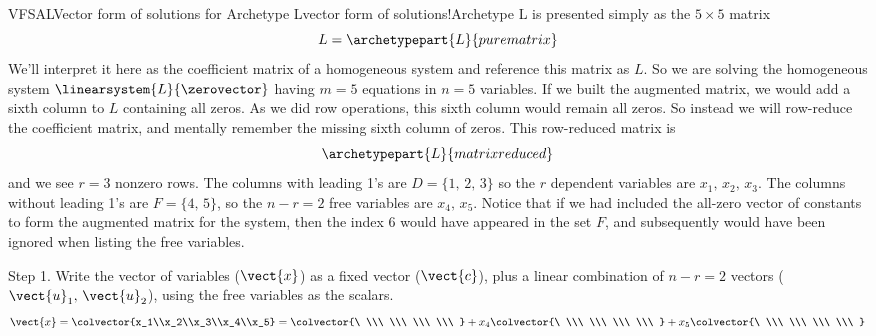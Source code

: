 \begin{example}{VFSAL}{Vector form of solutions for Archetype L}{vector form of solutions!Archetype L}
 is presented simply as the $5\times 5$ matrix
%
\begin{equation*}
L=\archetypepart{L}{purematrix}
\end{equation*}
%
We'll interpret it here as the coefficient matrix of a homogeneous system and reference this matrix as $L$.  So we are solving the homogeneous system $\linearsystem{L}{\zerovector}$ having $m=5$ equations in $n=5$ variables.  If we built the augmented matrix, we would add a sixth column to $L$ containing all zeros.  As we did row operations, this sixth column would remain all zeros.  So instead we will row-reduce the coefficient matrix, and mentally remember the missing sixth column of zeros.  This row-reduced matrix is
%
\begin{equation*}
\archetypepart{L}{matrixreduced}
\end{equation*}
%
and we see $r=3$ nonzero rows.  The columns with leading 1's are $D=\{1,\,2,\,3\}$ so the $r$ dependent variables are $x_1,\,x_2,\,x_3$.  The columns without leading 1's are $F=\{4,\,5\}$, so the $n-r=2$ free variables are $x_4,\,x_5$.  Notice that if we had included the all-zero vector of constants to form the augmented matrix for the system, then the index 6 would have appeared in the set $F$, and subsequently would have been ignored when listing the free variables.\par
%
Step 1.  Write the vector of variables ($\vect{x}$) as a fixed vector ($\vect{c}$), plus a linear combination of $n-r=2$ vectors ($\vect{u}_1,\,\vect{u}_2$), using the free variables as the scalars.
%
\begin{equation*}
\vect{x}=\colvector{x_1\\x_2\\x_3\\x_4\\x_5}=
\colvector{\ \\\ \\\ \\\ \\\ }+
x_4\colvector{\ \\\ \\\ \\\ \\\ }+
x_5\colvector{\ \\\ \\\ \\\ \\\ }

\end{equation*}
\end{example}
